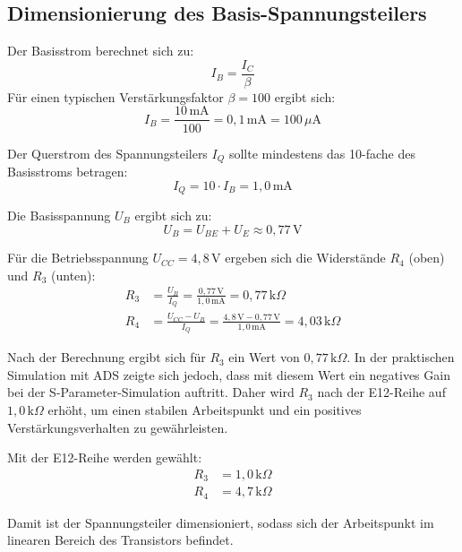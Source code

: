 \subsection{Dimensionierung des Basis-Spannungsteilers}
\label{subsec:basis-spannungsteiler}
Der Basisstrom berechnet sich zu:
\begin{equation}
    I_B = \frac{I_C}{\beta}
\end{equation}
Für einen typischen Verstärkungsfaktor $\beta = 100$ ergibt sich:
\begin{equation}
    I_B = \frac{10\,\mathrm{mA}}{100} = 0{,}1\,\mathrm{mA} = 100\,\mu\mathrm{A}
\end{equation}

Der Querstrom des Spannungsteilers $I_Q$ sollte mindestens das 10-fache des Basisstroms betragen:
\begin{equation}
    I_Q = 10 \cdot I_B = 1{,}0\,\mathrm{mA}
\end{equation}

Die Basisspannung $U_B$ ergibt sich zu:
\begin{equation}
    U_B = U_{BE} + U_E \approx 0{,}77\,\mathrm{V}
\end{equation}

Für die Betriebsspannung $U_{CC} = 4{,}8\,\mathrm{V}$ ergeben sich die Widerstände $R_4$ (oben) und $R_3$ (unten):
\begin{align}
    R_3 &= \frac{U_B}{I_Q} = \frac{0{,}77\,\mathrm{V}}{1{,}0\,\mathrm{mA}} = 0{,}77\,\mathrm{k}\Omega \\
    R_4 &= \frac{U_{CC} - U_B}{I_Q} = \frac{4{,}8\,\mathrm{V} - 0{,}77\,\mathrm{V}}{1{,}0\,\mathrm{mA}} = 4{,}03\,\mathrm{k}\Omega
\end{align}

Nach der Berechnung ergibt sich für $R_3$ ein Wert von $0{,}77\,\mathrm{k}\Omega$. In der praktischen Simulation mit ADS zeigte sich jedoch, dass mit diesem Wert ein negatives Gain bei der S-Parameter-Simulation auftritt. Daher wird $R_3$ nach der E12-Reihe auf $1{,}0\,\mathrm{k}\Omega$ erhöht, um einen stabilen Arbeitspunkt und ein positives Verstärkungsverhalten zu gewährleisten.

Mit der E12-Reihe werden gewählt:
\begin{align*}
    R_3 &= 1{,}0\,\mathrm{k}\Omega \\
    R_4 &= 4{,}7\,\mathrm{k}\Omega
\end{align*}

Damit ist der Spannungsteiler dimensioniert, sodass sich der Arbeitspunkt im linearen Bereich des Transistors befindet.


